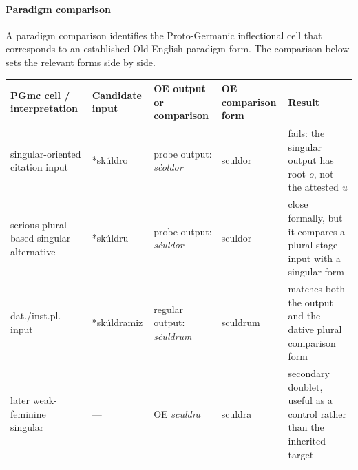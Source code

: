 \documentclass[
  british,
  a4paper,
]{article}
\newcounter{none} %
\begin{document}
\paragraph{Paradigm comparison}\label{paradigm-comparison-14}

A paradigm comparison identifies the Proto-Germanic inflectional cell
that corresponds to an established Old English paradigm form. The
comparison below sets the relevant forms side by side.

{\def\LTcaptype{none} %
\begin{longtable}[]{@{}
  >{\raggedright\arraybackslash}p{}
  >{\raggedright\arraybackslash}p{}
  >{\raggedright\arraybackslash}p{}
  >{\raggedright\arraybackslash}p{}
  >{\raggedright\arraybackslash}p{}@{}}
\toprule\noalign{}
\begin{minipage}[b]{\linewidth}\raggedright
PGmc cell / interpretation
\end{minipage} & \begin{minipage}[b]{\linewidth}\raggedright
Candidate input
\end{minipage} & \begin{minipage}[b]{\linewidth}\raggedright
OE output or comparison
\end{minipage} & \begin{minipage}[b]{\linewidth}\raggedright
OE comparison form
\end{minipage} & \begin{minipage}[b]{\linewidth}\raggedright
Result
\end{minipage} \\
\midrule\noalign{}
\endhead
\bottomrule\noalign{}
\endlastfoot
singular-oriented citation input & *skúldrō & probe output:
\emph{sċoldor} & sculdor & fails: the singular output has root \emph{o},
not the attested \emph{u} \\
serious plural-based singular alternative & *skúldru & probe output:
\emph{sċuldor} & sculdor & close formally, but it compares a
plural-stage input with a singular form \\
dat./inst.pl. input & *skúldramiz & regular output: \emph{sċuldrum} &
sculdrum & matches both the output and the dative plural comparison
form \\
later weak-feminine singular & --- & OE \emph{sculdra} & sculdra &
secondary doublet, useful as a control rather than the inherited
target \\
\end{longtable}
}
\end{document}
